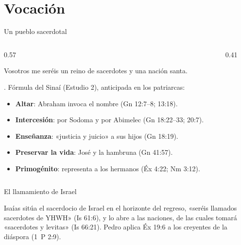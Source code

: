 \section{Vocación}
\begin{frame}{Un pueblo sacerdotal}
\begin{columns}[c,onlytextwidth]
\begin{column}{0.57\textwidth}
\begin{cita}Vosotros me seréis un reino de sacerdotes y una nación santa.\end{cita}
\small {}. Fórmula del Sinaí (Estudio 2), anticipada en los patriarcas:
\scriptsize
\begin{itemize}
\item \textbf{Altar}: Abraham invoca el nombre (Gn 12:7--8; 13:18).
\item \textbf{Intercesión}: por Sodoma y por Abimelec (Gn 18:22--33; 20:7).
\item \textbf{Enseñanza}: «justicia y juicio» a sus hijos (Gn 18:19).
\item \textbf{Preservar la vida}: José y la hambruna (Gn 41:57).
\item \textbf{Primogénito}: representa a los hermanos (Éx 4:22; Nm 3:12).
\end{itemize}
\end{column}
\begin{column}{0.41\textwidth}\end{column}
\end{columns}
\end{frame}

\begin{frame}{El llamamiento de Israel}
\centering
{}
\elabpropia
\vspace{4pt}
\begin{notalam}
Isaías sitúa el sacerdocio de Israel en el horizonte del regreso, «seréis llamados sacerdotes de YHWH» (Is 61:6), y lo abre a las naciones, de las cuales tomará «sacerdotes y levitas» (Is 66:21). Pedro aplica Éx 19:6 a los creyentes de la diáspora (1~P 2:9).
\end{notalam}
\end{frame}

